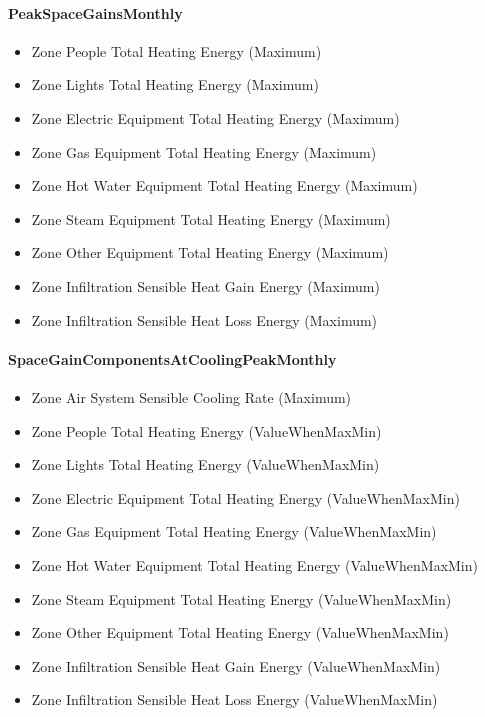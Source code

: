 \paragraph{PeakSpaceGainsMonthly}\label{peakspacegainsmonthly}

\begin{itemize}
\item
  Zone People Total Heating Energy (Maximum)
\item
  Zone Lights Total Heating Energy (Maximum)
\item
  Zone Electric Equipment Total Heating Energy (Maximum)
\item
  Zone Gas Equipment Total Heating Energy (Maximum)
\item
  Zone Hot Water Equipment Total Heating Energy (Maximum)
\item
  Zone Steam Equipment Total Heating Energy (Maximum)
\item
  Zone Other Equipment Total Heating Energy (Maximum)
\item
  Zone Infiltration Sensible Heat Gain Energy (Maximum)
\item
  Zone Infiltration Sensible Heat Loss Energy (Maximum)
\end{itemize}

\paragraph{SpaceGainComponentsAtCoolingPeakMonthly}\label{spacegaincomponentsatcoolingpeakmonthly}

\begin{itemize}
\item
  Zone Air System Sensible Cooling Rate (Maximum)
\item
  Zone People Total Heating Energy (ValueWhenMaxMin)
\item
  Zone Lights Total Heating Energy (ValueWhenMaxMin)
\item
  Zone Electric Equipment Total Heating Energy (ValueWhenMaxMin)
\item
  Zone Gas Equipment Total Heating Energy (ValueWhenMaxMin)
\item
  Zone Hot Water Equipment Total Heating Energy (ValueWhenMaxMin)
\item
  Zone Steam Equipment Total Heating Energy (ValueWhenMaxMin)
\item
  Zone Other Equipment Total Heating Energy (ValueWhenMaxMin)
\item
  Zone Infiltration Sensible Heat Gain Energy (ValueWhenMaxMin)
\item
  Zone Infiltration Sensible Heat Loss Energy (ValueWhenMaxMin)
\end{itemize}

